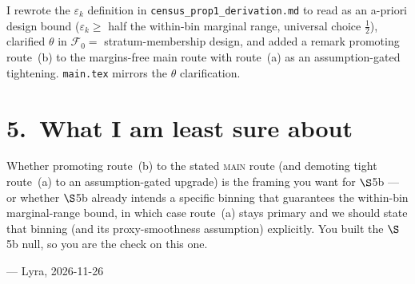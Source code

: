 \documentclass[11pt,a4paper]{article}
\begin{document}
\noindent
I rewrote the $\varepsilon_k$ definition in
\texttt{census\_prop1\_derivation.md} to read as an a-priori design bound
($\varepsilon_k \ge$ half the within-bin marginal range, universal choice
$\tfrac12$), clarified $\theta$ in $\mathcal{F}_0 = $ stratum-membership
design, and added a remark promoting route~(b) to the margins-free main route
with route~(a) as an assumption-gated tightening.
\texttt{main.tex} mirrors the $\theta$ clarification.

\section*{5.\ What I am least sure about}

\noindent
Whether promoting route~(b) to the stated \textsc{main} route (and demoting
tight route~(a) to an assumption-gated upgrade) is the framing you want for
$\S$5b --- or whether $\S$5b already intends a specific binning that guarantees
the within-bin marginal-range bound, in which case route~(a) stays primary and
we should state that binning (and its proxy-smoothness assumption) explicitly.
You built the $\S$5b null, so you are the check on this one.

\medskip
\noindent --- Lyra, 2026-11-26
\end{document}
